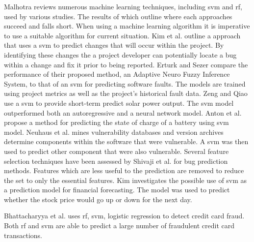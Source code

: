 Malhotra reviews numerous machine learning techniques, including \gls{svm} and \gls{rf}, used by various studies. The results of which outline where each approaches succeed and falls short. When using a machine learning algorithm it is imperative to use a suitable algorithm for current situation. Kim et al. outline a approach that uses a \gls{svm} to predict changes that will occur within the project. By identifying these changes the a project developer can potentially locate a bug within a change and fix it prior to being reported. Erturk and Sezer compare the performance of their proposed method, an Adaptive Neuro Fuzzy Inference System, to that of an \gls{svm} for predicting software faults. The models are trained using project metrics as well as the project's historical fault data. Zeng and Qiao use a \gls{svm} to provide short-term predict solar power output. The \gls{svm} model outperformed both an autoregressive and a neural network model. Anton et al. propose a method for predicting the state of charge of a battery using \gls{svm} model. Neuhaus et al. mines vulnerability databases and version archives determine components within the software that were vulnerable. A \gls{svm} was then used to predict other component that were also vulnerable. Several feature selection techniques have been assessed by Shivaji et al. for bug prediction methods. Features which are less useful to the prediction are removed to reduce the set to only the essential features. Kim investigates the possible use of \gls{svm} as a prediction model for financial forecasting. The model was used to predict whether the stock price would go up or down for the next day.

Bhattacharyya et al. uses \gls{rf}, \gls{svm}, logistic regression to detect credit card fraud. Both \gls{rf} and \gls{svm} are able to predict a large number of fraudulent credit card transactions.



        

